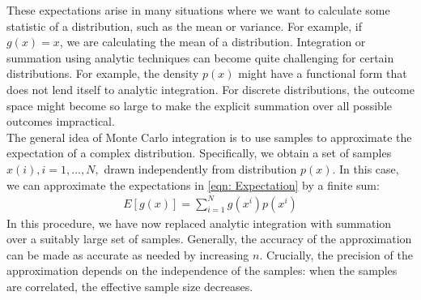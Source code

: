 These expectations arise in many situations where we want to calculate some statistic of a
distribution, such as the mean or variance. For example, if $g(x) = x$, we are calculating the mean of a distribution. Integration or summation using analytic techniques can become
quite challenging for certain distributions. For example, the density $p(x)$ might have a
functional form that does not lend itself to analytic integration. For discrete distributions, the outcome space might become so large to make the explicit summation over all possible outcomes impractical.\\
The general idea of Monte Carlo integration is to use samples to approximate the expectation of a complex distribution. Specifically, we obtain a set of samples $x(i), i = 1, . . . , N,$ drawn independently from distribution $p(x)$. In this case, we can approximate the expectations in \ref{eqn: Expectation} by a finite sum:
\begin{eqnarray} \label{eqn: Expectation Approx}
E[g(x)] = \sum_{i=1}^N g(x^i)p(x^i)
\end{eqnarray}
In this procedure, we have now replaced analytic integration with summation over a
suitably large set of samples. Generally, the accuracy of the approximation can be made as
accurate as needed by increasing $n$. Crucially, the precision of the approximation depends
on the independence of the samples: when the samples are correlated, the effective sample
size decreases.

